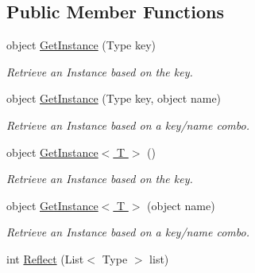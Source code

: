 \subsection*{Public Member Functions}
\begin{DoxyCompactItemize}
\item 
object \hyperlink{interfacestrange_1_1extensions_1_1injector_1_1api_1_1_i_injection_binder_a08359dc92534704919a0e9b89375db18}{Get\-Instance} (Type key)
\begin{DoxyCompactList}\small\item\em Retrieve an Instance based on the key. \end{DoxyCompactList}\item 
object \hyperlink{interfacestrange_1_1extensions_1_1injector_1_1api_1_1_i_injection_binder_aac899bd51070e8565fabab3a248cf3a5}{Get\-Instance} (Type key, object name)
\begin{DoxyCompactList}\small\item\em Retrieve an Instance based on a key/name combo. \end{DoxyCompactList}\item 
object \hyperlink{interfacestrange_1_1extensions_1_1injector_1_1api_1_1_i_injection_binder_a20bcbae77a818103c60eb063e75fd956}{Get\-Instance$<$ T $>$} ()
\begin{DoxyCompactList}\small\item\em Retrieve an Instance based on the key. \end{DoxyCompactList}\item 
object \hyperlink{interfacestrange_1_1extensions_1_1injector_1_1api_1_1_i_injection_binder_a26f141d072f219bb70513f5e21af6bbf}{Get\-Instance$<$ T $>$} (object name)
\begin{DoxyCompactList}\small\item\em Retrieve an Instance based on a key/name combo. \end{DoxyCompactList}\item 
\hypertarget{interfacestrange_1_1extensions_1_1injector_1_1api_1_1_i_injection_binder_ac9376845ce4eefd9e2795a6899f48c25}{int \hyperlink{interfacestrange_1_1extensions_1_1injector_1_1api_1_1_i_injection_binder_ac9376845ce4eefd9e2795a6899f48c25}{Reflect} (List$<$ Type $>$ list)}\label{interfacestrange_1_1extensions_1_1injector_1_1api_1_1_i_injection_binder_ac9376845ce4eefd9e2795a6899f48c25}


\end{DoxyCompactItemize}
